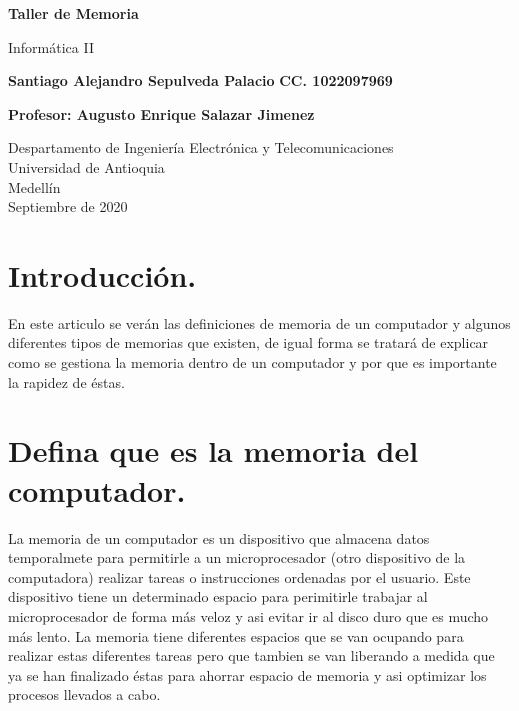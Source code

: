 \documentclass{article}
\begin{document}
\begin{titlepage}
    \begin{center}
        \vspace*{1cm}
            
        \Huge
        \textbf{Taller de Memoria}
            
        \vspace{0.5cm}
        \LARGE
        Informática II
            
        \vspace{1.5cm}
            
        \textbf{Santiago Alejandro Sepulveda Palacio }
        \textbf{CC. 1022097969 }  
        
        \vspace{1.5cm}
        \textbf{Profesor: Augusto Enrique Salazar Jimenez }
        \vfill
            
        \vspace{0.8cm}
            
        \Large
        Despartamento de Ingeniería Electrónica y Telecomunicaciones\\
        Universidad de Antioquia\\
        Medellín\\
        Septiembre de 2020
            
    \end{center}
\end{titlepage}

\tableofcontents
\newpage

\section{Introducción.}

En este articulo se verán las definiciones de memoria de un computador y algunos diferentes tipos de memorias que existen, de igual forma se tratará de explicar como se gestiona la memoria dentro de un computador y por que es importante la rapidez de éstas.  

\section{Defina que es la memoria del computador.}

La memoria de un computador es un dispositivo que almacena datos  temporalmete para permitirle a un microprocesador (otro dispositivo de la computadora) realizar tareas o instrucciones ordenadas por el usuario. Este dispositivo tiene un determinado espacio para perimitirle trabajar al microprocesador de forma más veloz y asi evitar ir al disco duro que es mucho más lento. La memoria tiene diferentes espacios que se van ocupando para realizar estas diferentes tareas pero que tambien se van liberando a medida que ya se han finalizado éstas para ahorrar espacio de memoria y asi optimizar los procesos llevados a cabo.
\end{document}
